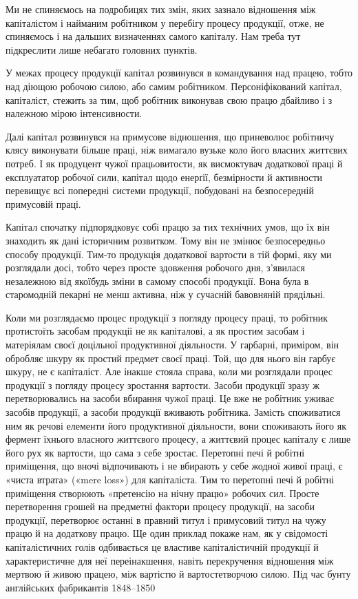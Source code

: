 
Ми не спиняємось на подробицях тих змін, яких зазнало відношення
між капіталістом і найманим робітником у перебігу
процесу продукції, отже, не спиняємось і на дальших визначеннях
самого капіталу. Нам треба тут підкреслити лише небагато головних
пунктів.

У межах процесу продукції капітал розвинувся в командування
над працею, тобто над діющою робочою силою, або самим робітником.
Персоніфікований капітал, капіталіст, стежить за тим, щоб
робітник виконував свою працю дбайливо і з належною мірою
інтенсивности.

Далі капітал розвинувся на примусове відношення, що приневолює
робітничу клясу виконувати більше праці, ніж вимагало
вузьке коло його власних життєвих потреб. І як продуцент чужої
працьовитости, як висмоктувач додаткової праці й експлуататор
робочої сили, капітал щодо енерґії, безмірности й активности
перевищує всі попередні системи продукції, побудовані на безпосередній
примусовій праці.

Капітал спочатку підпорядковує собі працю за тих технічних
умов, що їх він знаходить як дані історичним розвитком. Тому він
не змінює безпосередньо способу продукції. Тим-то продукція
додаткової вартости в тій формі, яку ми розглядали досі, тобто
через просте здовження робочого дня, з’явилася незалежною від
якоїбудь зміни в самому способі продукції. Вона була в старомодній
пекарні не менш активна, ніж у сучасній бавовняній прядільні.

Коли ми розглядаємо процес продукції з погляду процесу
праці, то робітник протистоїть засобам продукції не як капіталові,
а як простим засобам і матеріялам своєї доцільної продуктивної
діяльности. У гарбарні, приміром, він обробляє шкуру як простий
предмет своєї праці. Той, що для нього він гарбує шкуру, не є
капіталіст. Але інакше стояла справа, коли ми розглядали процес
продукції з погляду процесу зростання вартости. Засоби продукції
зразу ж перетворювались на засоби вбирання чужої праці. Це
вже не робітник уживає засобів продукції, а засоби продукції
вживають робітника. Замість споживатися ним як речові елементи
його продуктивної діяльности, вони споживають його як
фермент їхнього власного життєвого процесу, а життєвий процес
капіталу є лише його рух як вартости, що сама з себе зростає.
Перетопні печі й робітні приміщення, що вночі відпочивають
і не вбирають у себе жодної живої праці, є «чиста втрата» («mere
loss») для капіталіста. Тим то перетопні печі й робітні приміщення
створюють «претенсію на нічну працю» робочих сил. Просте
перетворення грошей на предметні фактори процесу продукції,
на засоби продукції, перетворює останні в правний титул і примусовий
титул на чужу працю й на додаткову працю. Ще один
приклад покаже нам, як у свідомості капіталістичних голів одбивається
це властиве капіталістичній продукції й характеристичне
для неї переінакшення, навіть перекручення відношення між
мертвою й живою працею, між вартістю й вартостетворчою
силою. Під час бунту англійських фабрикантів 1848--1850~
\parbreak{}  %
